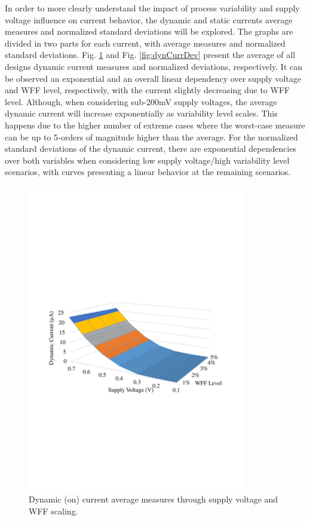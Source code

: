 \documentclass[diss,pgmicro,english]{iiufrgs}
\begin{document}
In order to more clearly understand the impact of process variability and supply voltage influence on current behavior, the dynamic and static currents average measures and normalized standard deviations will be explored. The graphs are divided in two parts for each current, with average measures and normalized standard deviations. Fig. \ref{fig:dynCurrAbs} and Fig. \ref{fig:dynCurrDev} present the average of all designs dynamic current measures and normalized deviations, respectively. It can be observed an exponential and an overall linear dependency over supply voltage and WFF level, respectively, with the current slightly decreasing due to WFF level. Although, when considering sub-200mV supply voltages, the average dynamic current will increase exponentially as variability level scales. This happens due to the higher number of extreme cases where the worst-case measure can be up to 5-orders of magnitude higher than the average. For the normalized standard deviations of the dynamic current, there are exponential dependencies over both variables when considering low supply voltage/high variability level scenarios, with curves presenting a linear behavior at the remaining scenarios.



    \begin{figure}[t]
        \centering
            \includegraphics[width=0.85\textwidth, trim={1.25cm 9cm 2cm 11cm}, clip]{dynamicCurrAbs.pdf}
            \caption{Dynamic (on) current average measures through supply voltage and WFF scaling.}
        \label{fig:dynCurrAbs}
    \end{figure}
\end{document}
